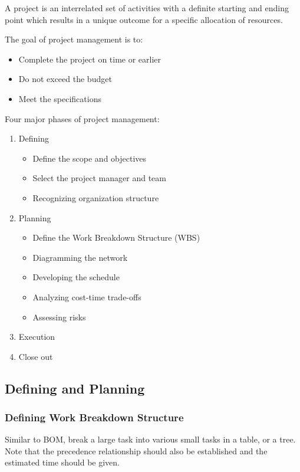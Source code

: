 \documentclass{article}
\newcommand{\red}[1]{\color{red}#1\color{black}\xspace}
\begin{document}
A project is an interrelated set of activities with a \red{definite starting and ending point}
which results in a \red{unique outcome} for a \red{specific allocation of resources}.

The goal of project management is to:
\begin{itemize}
	\item Complete the project on time or earlier
	\item Do not exceed the budget
	\item Meet the specifications
\end{itemize}

Four major phases of project management:
\begin{enumerate}
	\item Defining
		\begin{itemize}
			\item Define the scope and objectives
			\item Select the project manager and team
			\item Recognizing organization structure
		\end{itemize}
	\item Planning
		\begin{itemize}
			\item Define the Work Breakdown Structure (WBS)
			\item Diagramming the network
			\item Developing the schedule
			\item Analyzing cost-time trade-offs
			\item Assessing risks
		\end{itemize}
	\item Execution
	\item Close out
\end{enumerate}

\subsection{Defining and Planning}

\subsubsection{Defining Work Breakdown Structure}

Similar to BOM, break a large task into various small tasks in a table, or a tree.
Note that the precedence relationship should also be established and the estimated time should be given.
\end{document}
